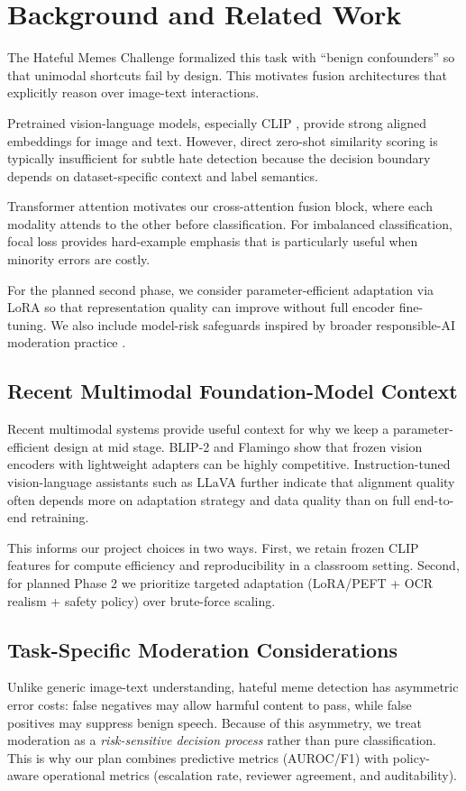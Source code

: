 \documentclass[11pt]{article}
\begin{document}
\section{Background and Related Work}
The Hateful Memes Challenge \cite{kiela2020hateful} formalized this task with ``benign confounders'' so that unimodal shortcuts fail by design. This motivates fusion architectures that explicitly reason over image-text interactions.

Pretrained vision-language models, especially CLIP \cite{radford2021clip}, provide strong aligned embeddings for image and text. However, direct zero-shot similarity scoring is typically insufficient for subtle hate detection because the decision boundary depends on dataset-specific context and label semantics.

Transformer attention \cite{vaswani2017attention} motivates our cross-attention fusion block, where each modality attends to the other before classification. For imbalanced classification, focal loss \cite{lin2017focal} provides hard-example emphasis that is particularly useful when minority errors are costly.

For the planned second phase, we consider parameter-efficient adaptation via LoRA \cite{hu2022lora} so that representation quality can improve without full encoder fine-tuning. We also include model-risk safeguards inspired by broader responsible-AI moderation practice \cite{weidinger2021ethical}.

\subsection{Recent Multimodal Foundation-Model Context}
Recent multimodal systems provide useful context for why we keep a parameter-efficient design at mid stage. BLIP-2 \cite{li2023blip2} and Flamingo \cite{alayrac2022flamingo} show that frozen vision encoders with lightweight adapters can be highly competitive. Instruction-tuned vision-language assistants such as LLaVA \cite{liu2023llava} further indicate that alignment quality often depends more on adaptation strategy and data quality than on full end-to-end retraining.

This informs our project choices in two ways. First, we retain frozen CLIP features for compute efficiency and reproducibility in a classroom setting. Second, for planned Phase 2 we prioritize targeted adaptation (LoRA/PEFT + OCR realism + safety policy) over brute-force scaling.

\subsection{Task-Specific Moderation Considerations}
Unlike generic image-text understanding, hateful meme detection has asymmetric error costs: false negatives may allow harmful content to pass, while false positives may suppress benign speech. Because of this asymmetry, we treat moderation as a \emph{risk-sensitive decision process} rather than pure classification. This is why our plan combines predictive metrics (AUROC/F1) with policy-aware operational metrics (escalation rate, reviewer agreement, and auditability).
\end{document}
